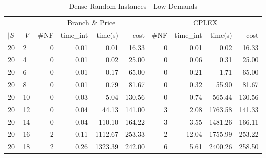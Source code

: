 \begin{appendices}
\begin{table*}[h]
\scriptsize
\begin{center}
\caption{Dense Random Instances - Low Demands}
\begin{tabular} {l l | r r r r | r r r r}
\hline
       &                                 &  \multicolumn{4}{c|}{Branch \& Price}                                & \multicolumn{4}{c}{CPLEX}                 \\
 $|S|$ & $|V|$                           &  \#NF  & time\_int     &  time(s)      &  cost            &  \#NF   &  time\_int   &  time(s)       &  cost       \\ 
 \hline                                                                                                                                                      
 20 & 2                                  &  0           &  0.01         &  0.01      &  16.33           &  0            &   0.01       & 0.02        &  16.33       \\ 
 20 & 4                                  &  0           &  0.01         &  0.02      &  25.00           &  0            &   0.06       & 0.31        &  25.00       \\ 
 20 & 6                                  &  0           &  0.01         &  0.17      &  65.00           &  0            &   0.21       & 1.71        &  65.00       \\ 
 20 & 8                                  &  0           &  0.01         &  0.79      &  81.67           &  0            &   0.32       & 55.90       &  81.67       \\ 
 20 & 10                                 &  0           &  0.03         &  5.04      &  130.56          &  0            &   0.74       & 565.44      &  130.56      \\ 
 20 & 12                                 &  0           &  0.04         &  44.13     &  141.00          &  3            &   2.08       & 1763.58     &  141.33      \\ 
 20 & 14                                 &  0           &  0.04         &  110.10    &  164.22          &  3            &   3.55       & 1481.26     &  166.11      \\ 
 20 & 16                                 &  2           &  0.11         &  1112.67   &  253.33          &  2            &   12.04      & 1755.99     &  253.22      \\ 
 20 & 18                                 &  2           &  0.26         &  1323.39   &  242.00          &  6            &   5.61       & 2400.26     &  258.50      \\ 

\end{tabular}
\end{center}
\end{table*}
\end{appendices}

